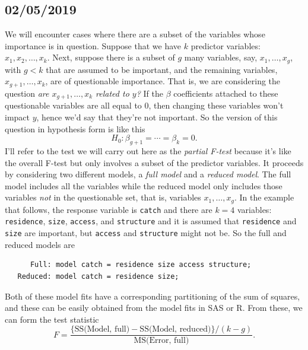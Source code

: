 \documentclass[a4paper, 12pt]{article}
\theoremstyle{plain}
\theoremstyle{definition}
\theoremstyle{remark}
\begin{document}
\subsection*{02/05/2019}

We will encounter cases where there are a subset of the variables whose importance is in question.  Suppose that we have $k$ predictor variables: $x_1,x_2,\ldots,x_k$.  Next, suppose there is a subset of $g$ many variables, say, $x_1,\ldots,x_g$, with $g < k$ that are assumed to be important, and the remaining variables, $x_{g+1},\ldots,x_k$, are of questionable importance.  That is, we are considering the question {\em are $x_{g+1},\ldots,x_k$ related to $y$?}  If the $\beta$ coefficients attached to these questionable variables are all equal to 0, then changing these variables won't impact $y$, hence we'd say that they're not important.  So the version of this question in hypothesis form is like this
\[ H_0: \beta_{g+1} = \cdots = \beta_k = 0. \]
I'll refer to the test we will carry out here as the {\em partial F-test} because it's like the overall F-test but only involves a subset of the predictor variables.  It proceeds by considering two different models, a {\em full model} and a {\em reduced model}.  The full model includes all the variables while the reduced model only includes those variables {\em not} in the questionable set, that is, variables $x_1,\ldots,x_g$.  In the example that follows, the response variable is {\tt catch} and there are $k=4$ variables: {\tt residence}, {\tt size}, {\tt access}, and {\tt structure} and it is assumed that {\tt residence} and {\tt size} are important, but {\tt access} and {\tt structure} might not be.  So the full and reduced models are 
{\small
\begin{verbatim}
      Full: model catch = residence size access structure;
   Reduced: model catch = residence size; 
\end{verbatim}
}
Both of these model fits have a corresponding partitioning of the sum of squares, and these can be easily obtained from the model fits in SAS or R.  From these, we can form the test statistic
\[ F = \frac{\{\text{SS(Model, full)} - \text{SS(Model, reduced)}\}/(k-g)}{\text{MS(Error, full)}}. \]
\end{document}
